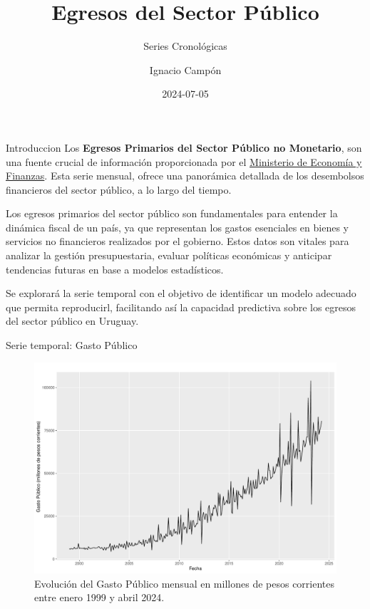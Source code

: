 \documentclass[
  ignorenonframetext,
]{beamer}
\title{Egresos del Sector Público}
\subtitle{Series Cronológicas}
\author{Ignacio Campón}
\date{2024-07-05}
\begin{document}
\frame{\titlepage}

\begin{frame}{Introduccion}
\protect\hypertarget{introduccion}{}
Los \textbf{Egresos Primarios del Sector Público no Monetario}, son una
fuente crucial de información proporcionada por el
\href{https://www.gub.uy/ministerio-economia-finanzas/datos-y-estadisticas/estadisticas/informacion-resultados-del-sector-publico}{Ministerio
de Economía y Finanzas}. Esta serie mensual, ofrece una panorámica
detallada de los desembolsos financieros del sector público, a lo largo
del tiempo.

Los egresos primarios del sector público son fundamentales para entender
la dinámica fiscal de un país, ya que representan los gastos esenciales
en bienes y servicios no financieros realizados por el gobierno. Estos
datos son vitales para analizar la gestión presupuestaria, evaluar
políticas económicas y anticipar tendencias futuras en base a modelos
estadísticos.

Se explorará la serie temporal con el objetivo de identificar un modelo
adecuado que permita reproducirl, facilitando así la capacidad
predictiva sobre los egresos del sector público en Uruguay.
\end{frame}

\begin{frame}{Serie temporal: Gasto Público}
\protect\hypertarget{serie-temporal-gasto-puxfablico}{}
\begin{figure}[H]

{\centering \includegraphics[width=0.85\linewidth]{presentacion_files/figure-beamer/plot_series_inicial-1} 

}

\caption{\label{gasto_publico} Evolución del Gasto Público mensual en millones de pesos corrientes entre enero 1999 y abril 2024.}\label{fig:plot_series_inicial}
\end{figure}
\end{frame}
\end{document}

